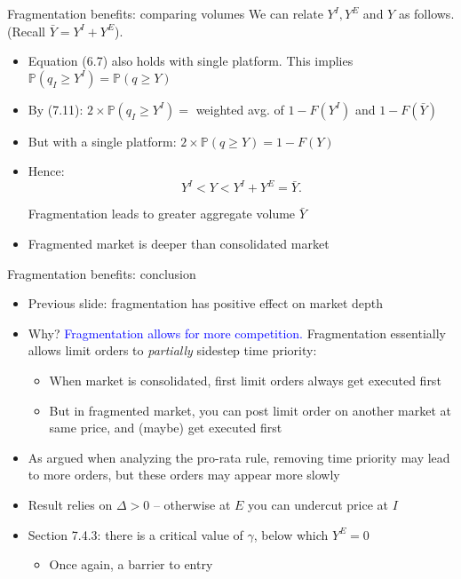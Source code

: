 \documentclass[english,10pt
,aspectratio=169
]{beamer}
\begin{document}
\begin{frame}{Fragmentation benefits: comparing volumes}
We can relate $Y^I, Y^E$ and $Y$ as follows. (Recall $\bar{Y}=Y^I+Y^E$).
\begin{itemize}
\item  Equation (6.7) also holds with single platform. This implies $\mathbb{P}(q_I \geq Y^I) = \mathbb{P}(q \geq Y)$ 
\item By (7.11): $2\times \mathbb{P}(q_I \geq Y^I) =$ weighted avg. of $1-F(Y^I)$ and $1-F(\bar{Y})$
\item But with a single platform: $2 \times \mathbb{P}(q \geq Y)=1-F(Y)$
\item Hence:
\[
Y^I<Y<Y^I+Y^E = \bar{Y}.
\]
\begin{block}{}
\begin{center}
Fragmentation leads to greater aggregate volume $\bar{Y}$
\end{center}
\end{block}
\item Fragmented market is deeper than consolidated market
\end{itemize}
\end{frame}


\begin{frame}{Fragmentation benefits: conclusion}
\begin{itemize}
\item Previous slide: fragmentation has positive effect on market depth
\item Why? \textcolor{blue}{Fragmentation allows for more competition.} Fragmentation essentially allows limit orders to \textit{partially} sidestep time priority:
\begin{itemize}
\item When market is consolidated, first limit orders always get executed first
\item But in fragmented market, you can post limit order on another market at same price, and (maybe) get executed first
\end{itemize}
\item As argued when analyzing the pro-rata rule, removing time priority may lead to more orders, but these orders may appear more slowly
\item Result relies on $\Delta>0$ -- otherwise at $E$ you can undercut price at $I$ 
\item Section 7.4.3: there is a critical value of $\gamma$, below which $Y^E=0$
\begin{itemize}
\item Once again, a barrier to entry
\end{itemize}
\end{itemize}
\end{frame}
\end{document}

